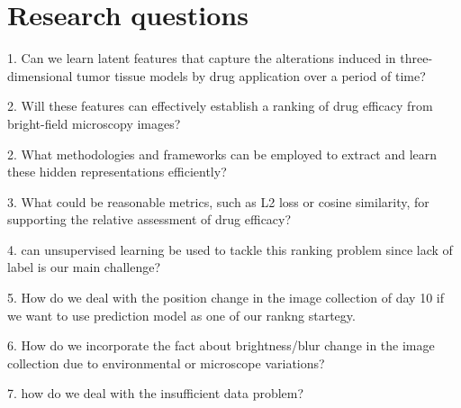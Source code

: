 \chapter{Research questions}\label{ch:Research questions}

1. Can we learn latent features that capture the alterations 
induced in three-dimensional tumor tissue models by drug application over a period of time?

2.  Will these features can effectively establish a ranking of drug efficacy 
from bright-field microscopy images?

2. What methodologies and frameworks can be employed to extract and learn these
 hidden representations efficiently?

3. What could be reasonable metrics, such as L2 loss or cosine similarity, for 
supporting the relative assessment of drug efficacy?

4. can unsupervised learning be used to tackle this ranking problem since lack of label is 
our main challenge?

5. How do we deal with the position change in the image collection of day 10 if we want to use prediction 
model as one of our rankng startegy.

6. How do we incorporate the fact about brightness/blur change in the image collection due to environmental or microscope 
variations?

7. how do we deal with the insufficient data problem?
